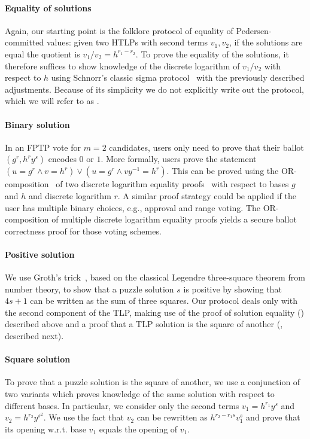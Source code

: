 
 
\paragraph{Equality of solutions} 
Again, our starting point is the folklore protocol of equality of Pedersen-committed values: given two HTLPs with second terms $v_1, v_2$, if the solutions are equal the quotient is $v_1/v_2 = h^{r_1-r_2}$. To prove the equality of the solutions, it therefore suffices to show knowledge of the discrete logarithm of $v_1/v_2$ with respect to $h$ using Schnorr's classic sigma protocol~\cite{C:Schnorr89} with the previously described adjustments. Because of its simplicity we do not explicitly write out the protocol, which we will refer to as \zkposeq.

% 

\paragraph{Binary solution} 
In an FPTP vote for $m=2$ candidates, users only need to prove that their ballot $(g^r,h^ry^s)$ encodes $0$ or $1$. More formally, users prove the statement $(u=g^r\land v=h^r)\lor(u=g^r\land vy^{-1}=h^r)$. This can be proved using the OR-composition~\cite{C:CraDamSch94} of two discrete logarithm equality proofs~\cite{C:ChaPed92} with respect to bases $g$ and $h$ and discrete logarithm $r$. A similar proof strategy could be applied if the user has multiple binary choices, e.g., approval and range voting. The OR-composition of multiple discrete logarithm equality proofs yields a secure ballot correctness proof for those voting schemes. 

\paragraph{Positive solution} 
We use Groth's trick~\cite{ACNS:Groth05}, based on the classical Legendre three-square theorem from number theory, to show that a puzzle solution $s$ is positive by showing that $4s+1$ can be written as the sum of three squares. Our protocol deals only with the second component of the TLP, making use of the proof of solution equality (\zkposeq) described above and a proof that a TLP solution is the square of another (\zkposqs, described next).



\paragraph{Square solution} 
To prove that a puzzle solution is the square of another, we use a conjunction of two \zkpoks variants which proves knowledge of the same solution with respect to different bases. In particular, we consider only the second terms $v_1 = h^{r_1} y^s$ and $v_2 = h^{r_2} y^{s^2}$. We use the fact that $v_2$ can be rewritten as $h^{r_2 - r_1 s} v_1^s$ and prove that its opening w.r.t. base $v_1$ equals the opening of $v_1$.

